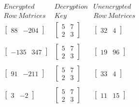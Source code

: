 \documentclass[10pt]{article}
\begin{document}
\[\begin{array}{ccc}
Encrypted & Decryption & Unencrypted\\
Row~Matrices & Key & Row~Matrices\\
\left[ \begin{array}{cc}88 & -204\end{array}\right] &
\left[ \begin{array}{cc}5 & 7\\2 & 3\end{array} \right] & \left[\begin{array}{cc}32 & 4\end{array}\right]\\
\\
\left[ \begin{array}{cc}-135 & 347\end{array}\right] &
\left[ \begin{array}{cc}5 & 7\\2 & 3\end{array} \right] & \left[\begin{array}{cc}19& 96\end{array}\right]\\
\\
\left[ \begin{array}{cc}91 & -211\end{array}\right] &
\left[ \begin{array}{cc}5 & 7\\2 & 3\end{array} \right] & \left[\begin{array}{cc}33 & 4\end{array}\right]\\
\\
\left[ \begin{array}{cc}3 & -2\end{array}\right] &
\left[ \begin{array}{cc}5 & 7\\2 & 3\end{array} \right] & \left[\begin{array}{cc}11 & 15\end{array}\right]\\
\end{array}
\]
\end{document}
